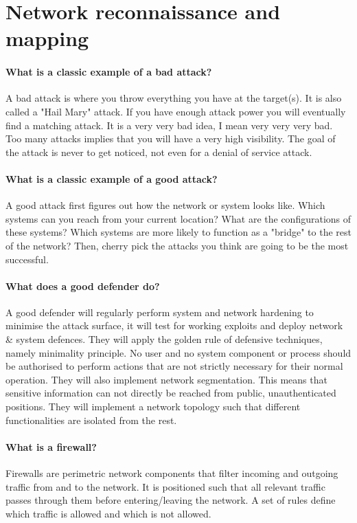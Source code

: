 \section{Network reconnaissance and mapping}
\paragraph{What is a classic example of a bad attack?}
A bad attack is where you throw everything you have at the target(s). It is also called a "Hail Mary" attack. If you have enough attack power you will eventually find a matching attack. It is a very very bad idea, I mean very very very bad. Too many attacks implies that you will have a very high visibility. The goal of the attack is never to get noticed, not even for a denial of service attack.

\paragraph{What is a classic example of a good attack?}
A good attack first figures out how the network or system looks like. Which systems can you reach from your current location? What are the configurations of these systems? Which systems are more likely to function as a "bridge" to the rest of the network? Then, cherry pick the attacks you think are going to be the most successful.

\paragraph{What does a good defender do?}
A good defender will regularly perform system and network hardening to minimise the attack surface, it will test for working exploits and deploy network \& system defences. They will apply the golden rule of defensive techniques, namely minimality principle. No user and no system component or process should be authorised to perform actions that are not strictly necessary for their normal operation. They will also implement network segmentation. This means that sensitive information can not directly be reached from public, unauthenticated positions. They will implement a network topology such that different functionalities are isolated from the rest.

\paragraph{What is a firewall?}
Firewalls are perimetric network components that filter incoming and outgoing traffic from and to the network. It is positioned such that all relevant traffic passes through them before entering/leaving the network. A set of rules define which traffic is allowed and which is not allowed.

